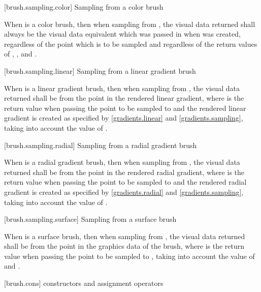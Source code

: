  [brush.sampling.color] {Sampling from a color brush}

\pnum
When  is a color brush, then when sampling from , the visual data returned shall always be the visual data equivalent  which was passed in when  was created, regardless of the point which is to be sampled and regardless of the return values of , , and .

 [brush.sampling.linear] {Sampling from a linear gradient brush}

\pnum
When  is a linear gradient brush, then when sampling from , the visual data returned shall be from the point  in the rendered linear gradient, where  is the return value when passing the point to be sampled to  and the rendered linear gradient is created as specified by \ref{gradients.linear} and \ref{gradients.sampling}, taking into account the value of .

 [brush.sampling.radial] {Sampling from a radial gradient brush}

\pnum
When  is a radial gradient brush, then when sampling from , the visual data returned shall be from the point  in the rendered radial gradient, where  is the return value when passing the point to be sampled to  and the rendered radial gradient is created as specified by \ref{gradients.radial} and \ref{gradients.sampling}, taking into account the value of .

 [brush.sampling.surface] {Sampling from a surface brush}

\pnum
When  is a surface brush, then when sampling from , the visual data returned shall be from the point  in the graphics data of the brush, where  is the return value when passing the point to be sampled to , taking into account the value of  and .

 [brush.cons] { constructors and assignment operators}

